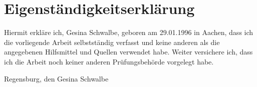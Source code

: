 \chapter*{Eigenständigkeitserklärung}
\thispagestyle{empty}
Hiermit erkläre ich, Gesina Schwalbe, geboren am 29.01.1996 in Aachen,
dass ich die vorliegende Arbeit selbstständig verfasst und keine
anderen als die angegebenen Hilfsmittel und Quellen verwendet
habe. Weiter versichere ich, dass ich die Arbeit noch keiner anderen
Prüfungsbehörde vorgelegt habe.

\vspace*{5em}
Regensburg, den \abgabedatum
\hfill
Gesina Schwalbe


